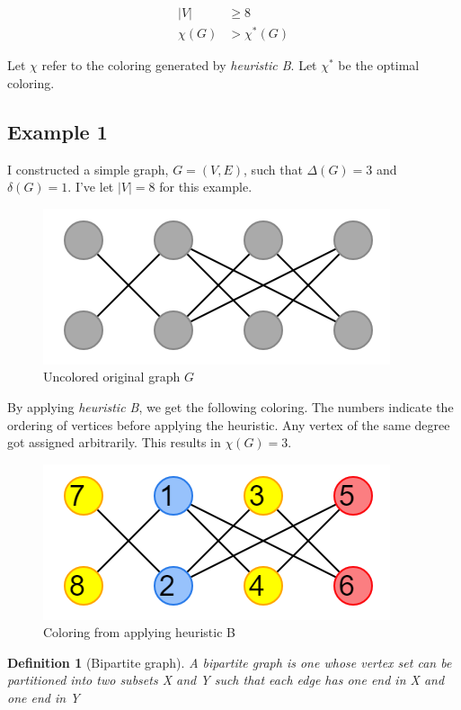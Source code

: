 \documentclass{article}
\newtheorem*{definition}{Definition}
\begin{document}
\begin{align}
|V| &\geq 8 \\
\chi(G) &> \chi^{*}(G)
\end{align}

Let \(\chi\) refer to the coloring generated by \emph{heuristic B}. Let \(\chi^{*}\) be the optimal coloring.

\subsection*{Example 1}
I constructed a simple graph, \(G = (V, E)\), such that \(\Delta(G) = 3\) and \(\delta(G) = 1\). I've let \(|V| = 8\) for this example.

\begin{figure}[H]
\centering
\includegraphics[scale=0.6]{images/graph-1.png}
\caption{Uncolored original graph \(G\)}
\end{figure}

By applying \emph{heuristic B}, we get the following coloring. The numbers indicate the ordering of vertices before applying the heuristic. Any vertex of the same degree got assigned arbitrarily. This results in \(\chi(G) = 3\).

\begin{figure}[H]
\centering
\includegraphics[scale=0.6]{images/graph-2.png}
\caption{Coloring from applying heuristic B}
\end{figure}

\begin{definition}[Bipartite graph]
A bipartite graph is one whose vertex set can be partitioned into two subsets X and Y such that each edge has one end in X and one end in Y
\end{definition}
\end{document}
